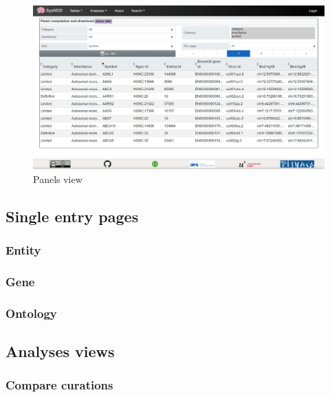 \documentclass[
]{article}
\begin{document}
\begin{figure}
\centering
\includegraphics{./static/img/02_10-sysndd.dbmr.unibe.ch_Panels.png}
\caption{Panels view}
\end{figure}

\hypertarget{single-entry-pages}{%
\subsection{Single entry pages}\label{single-entry-pages}}

\hypertarget{entity}{%
\subsubsection{Entity}\label{entity}}

\hypertarget{gene}{%
\subsubsection{Gene}\label{gene}}

\hypertarget{ontology}{%
\subsubsection{Ontology}\label{ontology}}

\hypertarget{analyses-views}{%
\subsection{Analyses views}\label{analyses-views}}

\hypertarget{compare-curations}{%
\subsubsection{Compare curations}\label{compare-curations}}
\end{document}
